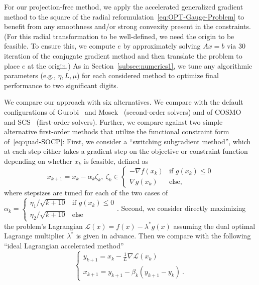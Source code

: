 \documentclass[sn-mathphys,Numbered]{sn-jnl}%
\begin{document}
For our projection-free method, we apply the accelerated generalized gradient method to the square of the radial reformulation~\eqref{eq:OPT-Gauge-Problem} to benefit from any smoothness and/or strong convexity present in the constraints.
(For this radial transformation to be well-defined, we need the origin to be feasible. To ensure this, we compute $e$ by approximately solving $Ax=b$ via $30$ iteration of the conjugate gradient method and then translate the problem to place $e$ at the origin.)
As in Section~\ref{subsec:numerics1}, we tune any algorithmic parameters (e.g., $\eta,L,\mu$) for each considered method to optimize final performance to two significant digits.

We compare our approach with six alternatives. We compare with the default configurations of Gurobi~\cite{gurobi} and Mosek~\cite{mosek} (second-order solvers) and of COSMO~\cite{cosmo} and SCS~\cite{scs} (first-order solvers). Further, we compare against two simple alternative first-order methods that utilize the functional constraint form of~\eqref{eq:quad-SOCP}: First, we consider a ``switching subgradient method'', which at each step either takes a gradient step on the objective or constraint function depending on whether $x_k$ is feasible, defined as
\begin{equation}
    x_{k+1} = x_k - \alpha_{k} \zeta_k, \ \zeta_k \in \begin{cases}  -\nabla f(x_k) & \text{if } g(x_k) \leq 0    \\ \nabla g(x_k) & \text{else,}          \end{cases}
\end{equation}
where stepsizes are tuned for each of the two cases of $\alpha_k = \begin{cases} \eta_1 / \sqrt{k+10} & \text{if } g(x_k) \leq 0\\ \eta_2 / \sqrt{k+10} & \text{else} \end{cases}$. Second, we consider directly maximizing the problem's Lagrangian $\mathcal{L}(x) = f(x) - \lambda^*g(x)$ assuming the dual optimal Lagrange multiplier $\lambda^*$ is given in advance. Then we compare with the following ``ideal Lagrangian accelerated method''
\begin{equation}
    \begin{cases}
        y_{k+1}=x_k-\frac{1}{L}\nabla \mathcal{L}(x_k)  \\
        x_{k+1}=y_{k+1} - \beta_k(y_{k+1}-y_k) \ . 
    \end{cases} 
\end{equation}
\end{document}
